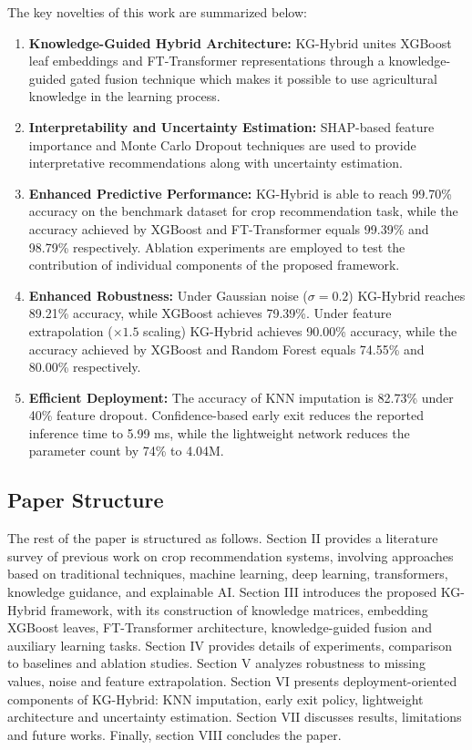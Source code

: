 \documentclass[journal]{IEEEtran}
\begin{document}
The key novelties of this work are summarized below:

\begin{enumerate}
    \item \textbf{Knowledge-Guided Hybrid Architecture:} KG-Hybrid unites XGBoost leaf embeddings and FT-Transformer representations through a knowledge-guided gated fusion technique which makes it possible to use agricultural knowledge in the learning process.

    \item \textbf{Interpretability and Uncertainty Estimation:} SHAP-based feature importance and Monte Carlo Dropout techniques are used to provide interpretative recommendations along with uncertainty estimation.

    \item \textbf{Enhanced Predictive Performance:} KG-Hybrid is able to reach 99.70\% accuracy on the benchmark dataset for crop recommendation task, while the accuracy achieved by XGBoost and FT-Transformer equals 99.39\% and 98.79\% respectively. Ablation experiments are employed to test the contribution of individual components of the proposed framework.

    \item \textbf{Enhanced Robustness:} Under Gaussian noise ($\sigma=0.2$) KG-Hybrid reaches 89.21\% accuracy, while XGBoost achieves 79.39\%. Under feature extrapolation ($\times 1.5$ scaling) KG-Hybrid achieves 90.00\% accuracy, while the accuracy achieved by XGBoost and Random Forest equals 74.55\% and 80.00\% respectively.

    \item \textbf{Efficient Deployment:} The accuracy of KNN imputation is 82.73\% under 40\% feature dropout. Confidence-based early exit reduces the reported inference time to 5.99 ms, while the lightweight network reduces the parameter count by 74\% to 4.04M.
\end{enumerate}

\subsection{Paper Structure}

The rest of the paper is structured as follows. Section II provides a literature survey of previous work on crop recommendation systems, involving approaches based on traditional techniques, machine learning, deep learning, transformers, knowledge guidance, and explainable AI. Section III introduces the proposed KG-Hybrid framework, with its construction of knowledge matrices, embedding XGBoost leaves, FT-Transformer architecture, knowledge-guided fusion and auxiliary learning tasks. Section IV provides details of experiments, comparison to baselines and ablation studies. Section V analyzes robustness to missing values, noise and feature extrapolation. Section VI presents deployment-oriented components of KG-Hybrid: KNN imputation, early exit policy, lightweight architecture and uncertainty estimation. Section VII discusses results, limitations and future works. Finally, section VIII concludes the paper.
\end{document}
